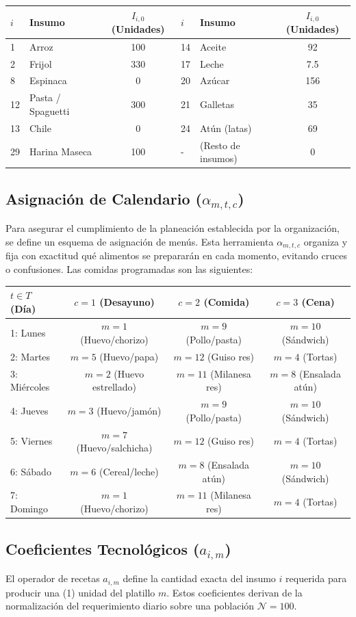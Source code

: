 \documentclass[12pt]{report}
\begin{document}
\begin{longtable}{llc|llc}
\toprule
$i$ & \textbf{Insumo} & $I_{i,0}$ (Unidades) & $i$ & \textbf{Insumo} & $I_{i,0}$ (Unidades) \\
\midrule
1  & Arroz & 100 & 14 & Aceite & 92 \\
2  & Frijol & 330 & 17 & Leche & 7.5 \\
8  & Espinaca & 0 & 20 & Azúcar & 156 \\
12 & Pasta / Spaguetti & 300 & 21 & Galletas & 35 \\
13 & Chile & 0 & 24 & Atún (latas) & 69 \\
29 & Harina Maseca & 100 & - & (Resto de insumos) & 0 \\
\bottomrule
\end{longtable}

\subsection{ Asignación de Calendario ($\alpha_{m,t,c}$)}
Para asegurar el cumplimiento de la planeación establecida por la organización, se define un esquema de asignación de menús. Esta herramienta $\alpha_{m,t,c}$ organiza y fija con exactitud qué alimentos se prepararán en cada momento, evitando cruces o confusiones. Las comidas programadas son las siguientes:

\begin{longtable}{lccc}
\toprule
$t \in T$ (Día) & $c=1$ (Desayuno) & $c=2$ (Comida) & $c=3$ (Cena) \\
\midrule
1: Lunes & $m=1$ (Huevo/chorizo) & $m=9$ (Pollo/pasta) & $m=10$ (Sándwich) \\
2: Martes & $m=5$ (Huevo/papa) & $m=12$ (Guiso res) & $m=4$ (Tortas) \\
3: Miércoles & $m=2$ (Huevo estrellado) & $m=11$ (Milanesa res) & $m=8$ (Ensalada atún) \\
4: Jueves & $m=3$ (Huevo/jamón) & $m=9$ (Pollo/pasta) & $m=10$ (Sándwich) \\
5: Viernes & $m=7$ (Huevo/salchicha) & $m=12$ (Guiso res) & $m=4$ (Tortas) \\
6: Sábado & $m=6$ (Cereal/leche) & $m=8$ (Ensalada atún) & $m=10$ (Sándwich) \\
7: Domingo & $m=1$ (Huevo/chorizo) & $m=11$ (Milanesa res) & $m=4$ (Tortas) \\
\bottomrule
\end{longtable}

\subsection{Coeficientes Tecnológicos ($a_{i,m}$)}
El operador de recetas $a_{i,m}$ define la cantidad exacta del insumo $i$ requerida para producir una (1) unidad del platillo $m$. Estos coeficientes derivan de la normalización del requerimiento diario sobre una población $\mathcal{N} = 100$.
\end{document}
